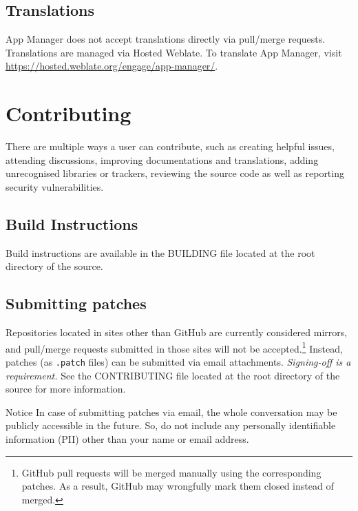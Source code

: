 \subsection{Translations}\label{subsec:translations} %
App Manager does not accept translations directly via pull/merge requests. Translations are managed via Hosted Weblate.
To translate App Manager, visit \url{https://hosted.weblate.org/engage/app-manager/}.


\section{Contributing}\label{sec:contributing} %
There are multiple ways a user can contribute, such as creating helpful issues, attending discussions, improving
documentations and translations, adding unrecognised libraries or trackers, reviewing the source code as well as
reporting security vulnerabilities.

\subsection{Build Instructions}\label{subsec:build-instructions} %
Build instructions are available in the BUILDING file located at the root directory of the source.

\subsection{Submitting patches}\label{subsec:submitting-patches} %
Repositories located in sites other than GitHub are currently considered mirrors, and pull/merge requests submitted in
those sites will not be accepted.\footnote{GitHub pull requests will be merged manually using the corresponding patches.
As a result, GitHub may wrongfully mark them closed instead of merged.} Instead, patches (as \texttt{.patch} files) can
be submitted via email attachments. \textit{Signing-off is a requirement.} See the CONTRIBUTING file located at the root
directory of the source for more information.

\begin{warning}{Notice}
    In case of submitting patches via email, the whole conversation may be publicly accessible in the future. So, do not
    include any personally identifiable information (PII) other than your name or email address.
\end{warning}



